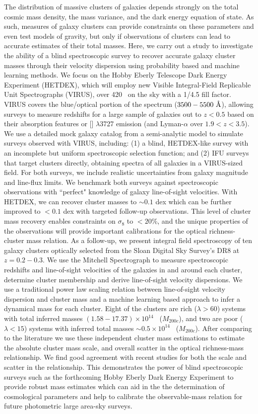 \indent The distribution of massive clusters of galaxies depends strongly on the total cosmic mass density, the mass variance, and the dark energy equation of state. As such, measures of galaxy clusters can provide constraints on these parameters and even test models of gravity, but only if observations of clusters can lead to accurate estimates of their total masses. Here, we carry out a study to investigate the ability of a blind spectroscopic survey to recover accurate galaxy cluster masses through their velocity dispersion using probability based and machine learning methods. We focus on the Hobby Eberly Telescope Dark Energy Experiment (HETDEX), which will employ new Visible Integral-Field Replicable Unit Spectrographs (VIRUS), over 420 \degsq\ on the sky with a 1/4.5 fill factor. VIRUS covers the blue/optical portion of the spectrum ($3500-5500~\hbox{\AA}$), allowing surveys to measure redshifts for a large sample of galaxies out to $z < 0.5$ based on their absorption features or \hbox{[]} $\lambda$3727 emission (and Lyman-$\alpha$ over $1.9 < z < 3.5$). We use a detailed mock galaxy catalog from a semi-analytic model to simulate surveys observed with VIRUS, including: (1) a blind, HETDEX-like survey with an incomplete but uniform spectroscopic selection function; and (2) IFU surveys that target clusters directly, obtaining spectra of all galaxies in a VIRUS-sized field. For both surveys, we include realistic uncertainties from galaxy magnitude and line-flux limits. We benchmark both surveys against spectroscopic observations with ``perfect" knowledge of galaxy line-of-sight velocities. With HETDEX, we can recover cluster masses to $\sim0.1$ dex which can be further improved to $<0.1$ dex with targeted follow-up observations. This level of cluster mass recovery enables constraints on $\sigma_8$ to $<20$\%, and the unique properties of the observations will provide important calibrations for the optical richness-cluster mass relation. As a follow-up, we present integral field spectroscopy of ten galaxy clusters optically selected from the Sloan Digital Sky Survey's DR8 at $z=0.2-0.3$. We use the Mitchell Spectrograph to measure spectroscopic redshifts and line-of-sight velocities of the galaxies in and around each cluster, determine cluster membership and derive line-of-sight velocity dispersions. We use a traditional power law scaling relation between line-of-sight velocity dispersion and cluster mass and a machine learning based approach to infer a dynamical mass for each cluster. Eight of the clusters are rich ($\lambda>60$) systems with total inferred masses $(1.58-17.37) \times 10^{14}$ \Msol\ ($M_{200c}$), and two are poor ($\lambda<15$) systems with inferred total masses $\sim0.5 \times 10^{14}$ \Msol\ ($M_{200c}$). After comparing to the literature  we use these independent cluster mass estimations to estimate the absolute cluster mass scale, and overall scatter in the optical richness-mass relationship. We find good agreement with recent studies for both the scale and scatter in the relationship. This demonstrates the power of blind spectroscopic surveys such as the forthcoming Hobby Eberly Dark Energy Experiment to provide robust mass estimates which can aid in the the determination of cosmological parameters and help to calibrate the observable-mass relation for future photometric large area-sky surveys.
\pagebreak{}
